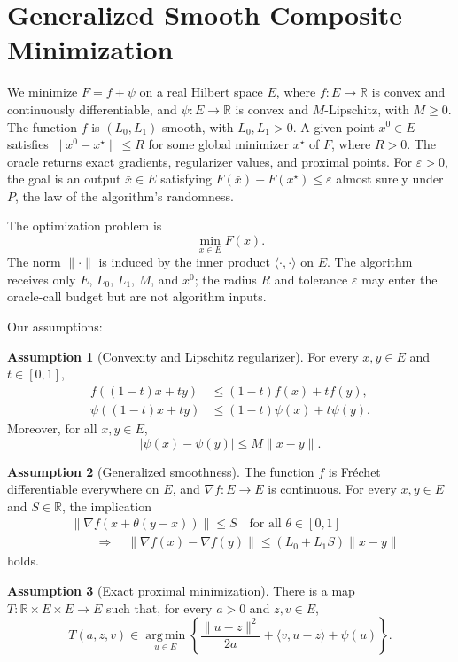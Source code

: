 \documentclass[10pt]{article}
\theoremstyle{definition}
\newtheorem{assumption}{Assumption}
\begin{document}
\section*{Generalized Smooth Composite Minimization}
We minimize $F=f+\psi$ on a real Hilbert space $E$, where $f:E\to\mathbb{R}$ is convex and continuously differentiable, and $\psi:E\to\mathbb{R}$ is convex and $M$-Lipschitz, with $M\geq0$. The function $f$ is $(L_0,L_1)$-smooth, with $L_0,L_1>0$. A given point $x^0\in E$ satisfies $\|x^0-x^\star\|\leq R$ for some global minimizer $x^\star$ of $F$, where $R>0$. The oracle returns exact gradients, regularizer values, and proximal points. For $\varepsilon>0$, the goal is an output $\bar{x}\in E$ satisfying $F(\bar{x})-F(x^\star)\leq\varepsilon$ almost surely under $P$, the law of the algorithm's randomness.

The optimization problem is
\[
\min_{x\in E} F(x).
\]
The norm $\|\cdot\|$ is induced by the inner product $\langle\cdot,\cdot\rangle$ on $E$. The algorithm receives only $E$, $L_0$, $L_1$, $M$, and $x^0$; the radius $R$ and tolerance $\varepsilon$ may enter the oracle-call budget but are not algorithm inputs.

Our assumptions:
\begin{assumption}[Convexity and Lipschitz regularizer]
For every $x,y\in E$ and $t\in[0,1]$,
\[
\begin{aligned}
f((1-t)x+ty)&\leq(1-t)f(x)+tf(y),\\
\psi((1-t)x+ty)&\leq(1-t)\psi(x)+t\psi(y).
\end{aligned}
\]
Moreover, for all $x,y\in E$,
\[
|\psi(x)-\psi(y)|\leq M\|x-y\|.
\]
\end{assumption}

\begin{assumption}[Generalized smoothness]
The function $f$ is Fr\'echet differentiable everywhere on $E$, and $\nabla f:E\to E$ is continuous. For every $x,y\in E$ and $S\in\mathbb{R}$, the implication
\[
\begin{aligned}
&\|\nabla f(x+\theta(y-x))\|\leq S
\quad\text{for all }\theta\in[0,1]\\
&\qquad\Longrightarrow\quad
\|\nabla f(x)-\nabla f(y)\|
\leq (L_0+L_1S)\|x-y\|
\end{aligned}
\]
holds.
\end{assumption}

\begin{assumption}[Exact proximal minimization]
There is a map $T:\mathbb{R}\times E\times E\to E$ such that, for every $a>0$ and $z,v\in E$,
\[
T(a,z,v)\in\operatorname*{arg\,min}_{u\in E}
\left\{
\frac{\|u-z\|^2}{2a}
+\langle v,u-z\rangle+\psi(u)
\right\}.
\]
\end{assumption}
\end{document}
